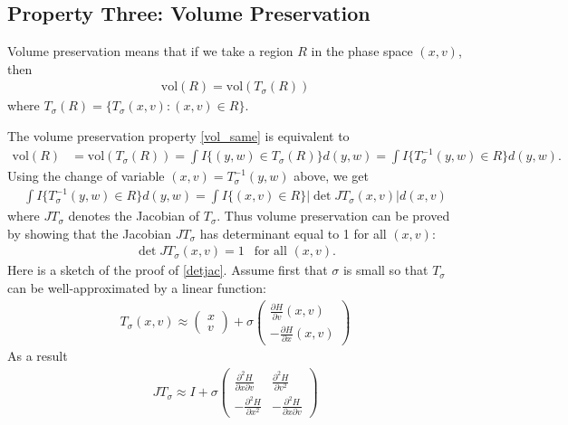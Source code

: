 \documentclass{scrartcl}
\begin{document}
\subsection{Property Three: Volume Preservation}
Volume preservation means that if we take a region $R$ in the phase
space $(x, v)$, then
\begin{align}\label{vol_same}
  \text{vol}(R) = \text{vol}(T_{\sigma}(R))
\end{align}
where $T_{\sigma}(R) = \{T_{\sigma}(x, v): (x, v) \in R\}$. 

The volume preservation property \eqref{vol_same} is equivalent to
\begin{align*}
  \text{vol}(R) &= \text{vol}(T_{\sigma}(R)) = \int I\{(y, w) \in
                  T_{\sigma}(R)\} d(y, w) = \int I\{T_{\sigma}^{-1}
                  (y, w) \in R\} d(y, w). 
\end{align*}
Using the change of variable $(x, v) = T_{\sigma}^{-1}(y, w)$ above,
we get
\begin{align*}
  \int I\{T_{\sigma}^{-1}
                  (y, w) \in R\} d(y, w) = \int I\{(x, v) \in R\}
  |\det J T_{\sigma}(x, v)| d(x, v)
\end{align*}
where $J T_{\sigma}$ denotes the Jacobian of $T_{\sigma}$. Thus volume
preservation can be proved by showing that the Jacobian $J T_{\sigma}$
has determinant equal to 1 for all $(x, v)$:
\begin{align}\label{detjac}
  \det J T_{\sigma}(x, v) = 1 ~~ \text{ for all $(x, v)$}. 
\end{align}
Here is a sketch of the proof of \eqref{detjac}. Assume first that
$\sigma$ is small so that 
$T_{\sigma}$ can be well-approximated by a linear
function:
\begin{align*}
  T_{\sigma}(x, v) \approx
  \begin{pmatrix}
    x \\ v
  \end{pmatrix} + \sigma
  \begin{pmatrix}
    \frac{\partial H}{\partial v}(x, v) \\ -    \frac{\partial H}{\partial x}(x, v)
  \end{pmatrix}
\end{align*}
As a result
\begin{align*}
  J T_{\sigma} \approx I + \sigma
  \begin{pmatrix}
    \frac{\partial^2 H}{\partial x \partial v} &  \frac{\partial^2
                                                 H}{\partial v^2}  \\ -\frac{\partial^2
                                                 H}{\partial x^2} & -
                                                                    \frac{\partial^2
                                                                    H}{\partial
                                                                    x
                                                                    \partial
                                                                    v}
  \end{pmatrix}
\end{align*}
\end{document}
